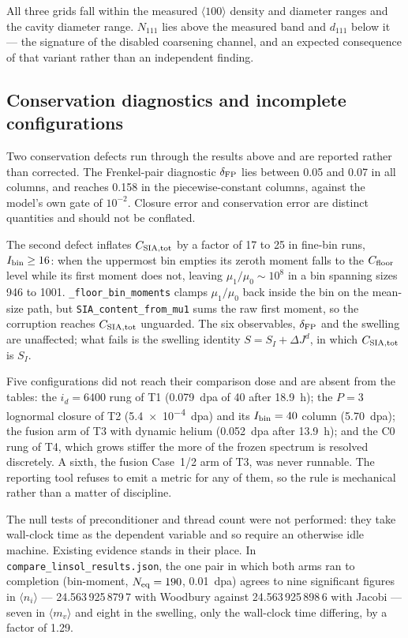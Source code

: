 \documentclass[11pt]{article}
\newcommand{\hkl}{$\langle100\rangle$}
\begin{document}
All three grids fall within the measured \hkl{} density and diameter ranges and
the cavity diameter range. $N_{111}$ lies above the measured band and $d_{111}$
below it --- the signature of the disabled coarsening channel, and an expected
consequence of that variant rather than an independent finding.

\FloatBarrier
\subsection{Conservation diagnostics and incomplete configurations}
\label{sec:incomplete}

Two conservation defects run through the results above and are reported rather
than corrected. The Frenkel-pair diagnostic $\delta_{\rm FP}$ lies between 0.05
and 0.07 in all columns, and reaches 0.158 in the piecewise-constant columns,
against the model's own gate of $10^{-2}$. Closure error and conservation error
are distinct quantities and should not be conflated.

The second defect inflates $C_{\rm SIA,tot}$ by a factor of 17 to 25 in
fine-bin runs, $I_{\rm bin} \ge 16$: when the uppermost bin empties its zeroth
moment falls to the $C_{\rm floor}$ level while its first moment does not,
leaving $\mu_1/\mu_0 \sim 10^8$ in a bin spanning sizes 946 to 1001.
\texttt{\_floor\_bin\_moments} clamps $\mu_1/\mu_0$ back inside the bin on the
mean-size path, but \texttt{SIA\_content\_from\_mu1} sums the raw first moment,
so the corruption reaches $C_{\rm SIA,tot}$ unguarded. The six observables,
$\delta_{\rm FP}$ and the swelling are unaffected; what fails is the swelling
identity $S = S_I + \Delta J^d$, in which $C_{\rm SIA,tot}$ is $S_I$.

Five configurations did not reach their comparison dose and are absent from the
tables: the $i_d = 6400$ rung of T1 (\SI{0.079}{dpa} of 40 after
\SI{18.9}{\hour}); the $P=3$ lognormal closure of T2 (\SI{5.4e-4}{dpa}) and its
$I_{\rm bin} = 40$ column (\SI{5.70}{dpa}); the fusion arm of T3 with dynamic
helium (\SI{0.052}{dpa} after \SI{13.9}{\hour}); and the C0 rung of T4, which
grows stiffer the more of the frozen spectrum is resolved discretely. A sixth,
the fusion Case~1/2 arm of T3, was never runnable. The reporting tool refuses to
emit a metric for any of them, so the rule is mechanical rather than a matter of
discipline.

The null tests of preconditioner and thread count were not performed: they take
wall-clock time as the dependent variable and so require an otherwise idle
machine. Existing evidence stands in their place. In
\texttt{compare\_linsol\_results.json}, the one pair in which both arms ran to
completion (bin-moment, $N_{\rm eq} = 190$, \SI{0.01}{dpa}) agrees to nine
significant figures in $\langle n_i\rangle$ --- 24.563\,925\,879\,7 with
Woodbury against 24.563\,925\,898\,6 with Jacobi --- seven in
$\langle m_v\rangle$ and eight in the swelling, only the wall-clock time
differing, by a factor of 1.29.
\end{document}
